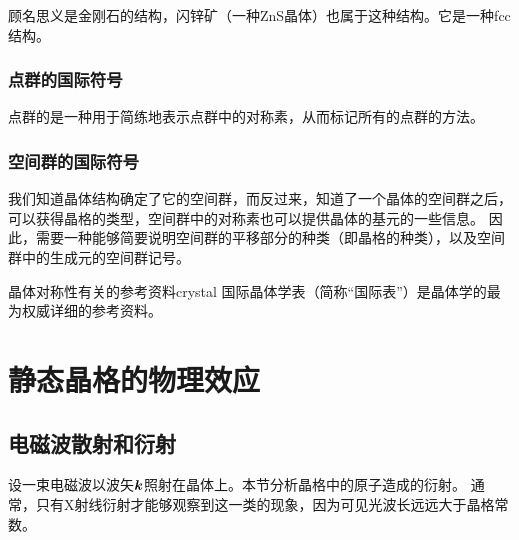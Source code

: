 顾名思义是金刚石的结构，闪锌矿（一种ZnS晶体）也属于这种结构。它是一种fcc结构。

\subsubsection{点群的国际符号} 

点群的是一种用于简练地表示点群中的对称素，从而标记所有的点群的方法。

\subsubsection{空间群的国际符号} 

我们知道晶体结构确定了它的空间群，而反过来，知道了一个晶体的空间群之后，可以获得晶格的类型，空间群中的对称素也可以提供晶体的基元的一些信息。
因此，需要一种能够简要说明空间群的平移部分的种类（即晶格的种类），以及空间群中的生成元的空间群记号。

\begin{info}{晶体对称性有关的参考资料}{crystal}
    国际晶体学表\cite{international-tables}（简称“国际表”）是晶体学的最为权威详细的参考资料。
\end{info}

\section{静态晶格的物理效应}

\subsection{电磁波散射和衍射}

设一束电磁波以波矢$\vb*{k}$照射在晶体上。本节分析晶格中的原子造成的衍射。
通常，只有X射线衍射才能够观察到这一类的现象，因为可见光波长远远大于晶格常数。


